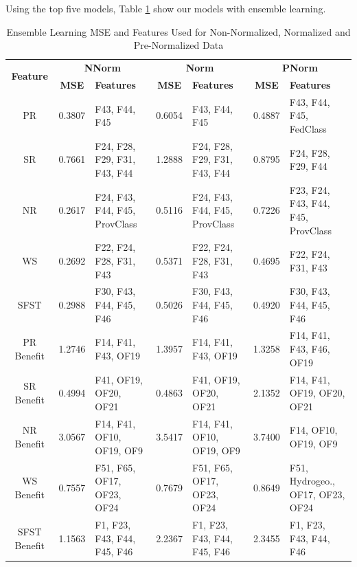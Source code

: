 \documentclass[12pt,letterpaper]{article}
\begin{document}
Using the top five models, Table \ref{reg_all_tab:summary_mse_features} show our models with ensemble learning.
\begin{table}
\centering
\begin{tabular}{|c||c|p{2.5cm}||c|p{2.5cm}||c|p{2.5cm}|}
\hline
\multirow{2}{*}{\textbf{Feature}} & \multicolumn{2}{c||}{\textbf{\ac{NNorm}}} & \multicolumn{2}{c||}{\textbf{Norm}} & \multicolumn{2}{c|}{\textbf{\ac{PNorm}}} \\
\cline{2-7}
 & \textbf{MSE} & \textbf{Features} & \textbf{MSE} & \textbf{Features} & \textbf{MSE} & \textbf{Features} \\
\hline
PR & 0.3807 & F43, F44, F45 & 0.6054 & F43, F44, F45 & 0.4887 & F43, F44, F45, FedClass \\
\hline
SR & 0.7661 & F24, F28, F29, F31, F43, F44 & 1.2888 & F24, F28, F29, F31, F43, F44 & 0.8795 & F24, F28, F29, F44 \\
\hline
NR & 0.2617 & F24, F43, F44, F45, ProvClass & 0.5116 & F24, F43, F44, F45, ProvClass & 0.7226 & F23, F24, F43, F44, F45, ProvClass \\
\hline
WS & 0.2692 & F22, F24, F28, F31, F43 & 0.5371 & F22, F24, F28, F31, F43 & 0.4695 & F22, F24, F31, F43 \\
\hline
SFST & 0.2988 & F30, F43, F44, F45, F46 & 0.5026 & F30, F43, F44, F45, F46 & 0.4920 & F30, F43, F44, F45, F46 \\
\hline
PR Benefit & 1.2746 & F14, F41, F43, OF19 & 1.3957 & F14, F41, F43, OF19 & 1.3258 & F14, F41, F43, F46, OF19 \\
\hline
SR Benefit & 0.4994 & F41, OF19, OF20, OF21 & 0.4863 & F41, OF19, OF20, OF21 & 2.1352 & F14, F41, OF19, OF20, OF21 \\
\hline
NR Benefit & 3.0567 & F14, F41, OF10, OF19, OF9 & 3.5417 & F14, F41, OF10, OF19, OF9 & 3.7400 & F14, OF10, OF19, OF9 \\
\hline
WS Benefit & 0.7557 & F51, F65, OF17, OF23, OF24 & 0.7679 & F51, F65, OF17, OF23, OF24 & 0.8649 & F51, Hydrogeo., OF17, OF23, OF24 \\
\hline
SFST Benefit & 1.1563 & F1, F23, F43, F44, F45, F46 & 2.2367 & F1, F23, F43, F44, F45, F46 & 2.3455 & F1, F23, F43, F44, F46 \\
\hline
\end{tabular}
\caption{Ensemble Learning MSE and Features Used for Non-Normalized, Normalized and Pre-Normalized Data}
\label{reg_all_tab:summary_mse_features}
\end{table}
\end{document}

